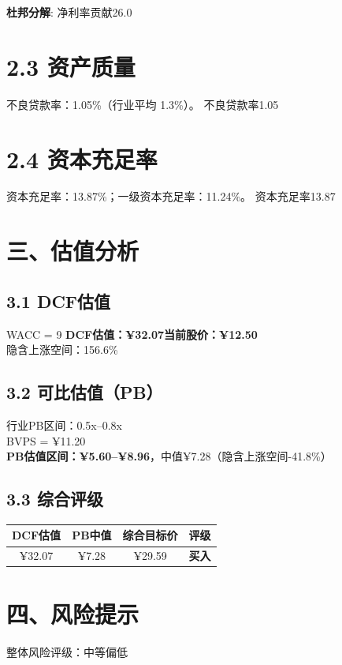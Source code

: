 \documentclass[12pt,a4paper]{article}
\begin{document}
\textbf{杜邦分解}: 净利率贡献26.0%

\section{2.3 资产质量}
不良贷款率：1.05\%（行业平均 1.3\%）。 不良贷款率1.05%

\section{2.4 资本充足率}
资本充足率：13.87\%；一级资本充足率：11.24\%。 资本充足率13.87%

\section{三、估值分析}
\subsection*{3.1 DCF估值}
WACC = 9%
\textbf{DCF估值：¥32.07}\hspace{2em}\textbf{当前股价：¥12.50}\\
隐含上涨空间：156.6\%

\subsection*{3.2 可比估值（PB）}
行业PB区间：0.5x--0.8x\\
BVPS = ¥11.20\\
\textbf{PB估值区间：¥5.60--¥8.96}，中值¥7.28（隐含上涨空间-41.8\%）

\subsection*{3.3 综合评级}
\centering
\begin{tabular}{@{}cccc@{}}\hline
\textbf{DCF估值} & \textbf{PB中值} & \textbf{综合目标价} & \textbf{评级} \\\hline
¥32.07 & ¥7.28 & ¥29.59 & \textbf{买入} \\\hline
\end{tabular}

\section{四、风险提示}
整体风险评级：中等偏低
\end{document}
